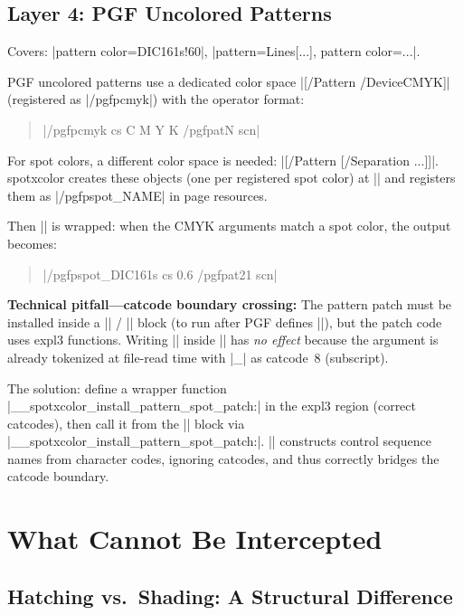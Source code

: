 \documentclass[luatex]{article}
\newcommand\pkg[1]{\textsf{#1}}
\begin{document}
\subsection{Layer 4: PGF Uncolored Patterns}

Covers: |pattern color=DIC161s!60|, |pattern={Lines[...]}, pattern color=...|.

PGF uncolored patterns use a dedicated color space |[/Pattern /DeviceCMYK]| (registered as |/pgfpcmyk|) with the operator format:
\begin{quote}
  |/pgfpcmyk cs C M Y K /pgfpatN scn|
\end{quote}

For spot colors, a different color space is needed: |[/Pattern [/Separation ...]]|.
\pkg{spotxcolor} creates these objects (one per registered spot color) at |\AtBeginDocument| and registers them as |/pgfpspot_NAME| in page resources.

Then |\pgfsys@setpatternuncolored| is wrapped: when the CMYK arguments match a spot color, the output becomes:
\begin{quote}
  |/pgfpspot_DIC161s cs 0.6 /pgfpat21 scn|
\end{quote}

\medskip
\noindent\textbf{Technical pitfall---catcode boundary crossing:}
The pattern patch must be installed inside a |\makeatletter| / |\AtBeginDocument| block (to run after PGF defines |\pgfsys@setpatternuncolored|), but the patch code uses \pkg{expl3} functions.
Writing |\ExplSyntaxOn| inside || has \emph{no effect} because the argument is already tokenized at file-read time with |_| as catcode~8 (subscript).

The solution: define a wrapper function |\__spotxcolor_install_pattern_spot_patch:| in the \pkg{expl3} region (correct catcodes), then call it from the |\makeatletter| block via |\csname __spotxcolor_install_pattern_spot_patch:\endcsname|.
|\csname| constructs control sequence names from character codes, ignoring catcodes, and thus correctly bridges the catcode boundary.

\section{What Cannot Be Intercepted}

\subsection{Hatching vs.\ Shading: A Structural Difference}
\end{document}
